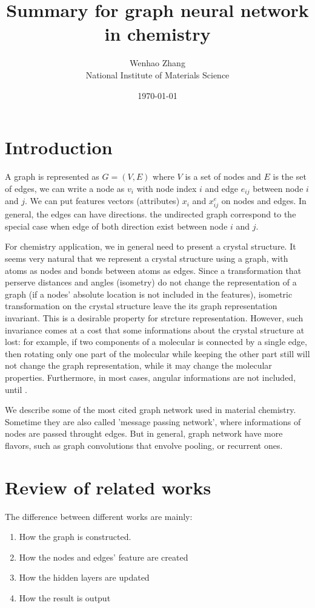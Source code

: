 \documentclass{article}
\begin{document}
\title{Summary for graph neural network in chemistry}
\author{Wenhao Zhang\\National Institute of Materials Science}
\date{\today}
\maketitle

\section{Introduction}
A graph is represented as $G = (V,E)$ where $V$ is a set of nodes and $E$ is the set of edges\cite{wu_2021}, we can
write a node as $v_i$ with node index $i$ and edge $e_{ij}$ between node $i$ and $j$. 
We can put features vectors (attributes) $x_i$ and $x^e_{ij}$ on nodes and edges. 
In general, the edges can have directions. the undirected graph correspond to the special case when edge of both
direction exist between node $i$ and $j$.

For chemistry application, we in general need to present a crystal structure. 
It seems very natural that we represent a crystal structure using a graph, with atoms as nodes and bonds between atoms 
as edges. 
Since a transformation that perserve distances and angles (isometry) do not change the representation of a graph 
(if a nodes' absolute location is not included in the features), isometric transformation on the crystal structure
leave the its graph representation invariant. This is a desirable property for strcture representation. 
However, such invariance comes at a cost that some informations about the crystal structure at lost: for example, if two 
components of a molecular is connected by a single edge, then rotating only one part of the molecular while keeping the 
other part still will not change the graph representation, while it may change the molecular properties. 
Furthermore, in most cases, angular informations are not included, until \cite{directional_klicpera}. 

We describe some of the most cited graph network used in material chemistry. Sometime they are also called 
'message passing network', where informations of nodes are passed throught edges. But in general, graph network 
have more flavors, such as graph convolutions that envolve pooling, or recurrent ones. 

\section{Review of related works}
The difference between different works are mainly:
\begin{enumerate}
    \item How the graph is constructed.
    \item How the nodes and edges' feature are created
    \item How the hidden layers are updated
    \item How the result is output
\end{enumerate}
\end{document}
